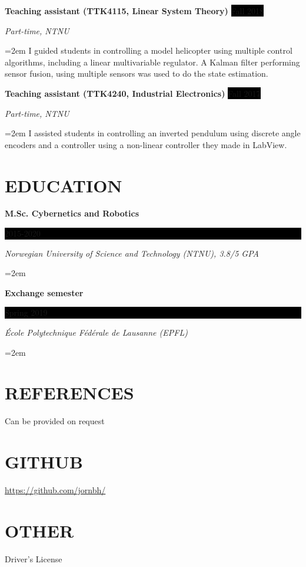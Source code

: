 \documentclass[paper=a4,fontsize=11pt,norsk]{scrartcl} %
\newlength{\spacebox}
\newcommand{\NewPart}[1]{\section*{\uppercase{#1}}}
\newcommand{\PersonalEntry}[2]{
		\noindent\hangindent=2em\hangafter=0 %
		\parbox{\spacebox}{        %
		\textit{#1}}		       %
		\hspace{1.5em} #2 \par}    %
\newcommand{\EducationEntry}[4]{
		\noindent \textbf{#1} \hfill      %
		\colorbox{Black}{%
			\parbox{6em}{%
			\hfill\color{White}#2}} \par  %
		\noindent \textit{#3} \par        %
		\noindent\hangindent=2em\hangafter=0 \small #4 %
		\normalsize \par}
\newcommand{\WorkEntry}[4]{				  %
		\noindent \textbf{#1} \hfill      %
		\colorbox{Black}{\color{White}#2} \par  %
		\noindent \textit{#3} \par              %
		\noindent\hangindent=2em\hangafter=0 \small #4 %
		\normalsize \par}
\begin{document}



\WorkEntry{Teaching assistant (TTK4115, Linear System Theory)}{Fall 2018}{Part-time, NTNU}
{I guided students in controlling a model helicopter using
multiple control algorithms, including a linear multivariable
regulator. A Kalman filter performing sensor fusion, using
multiple sensors was used to do the state estimation.
}

\WorkEntry{Teaching assistant (TTK4240, Industrial Electronics)}{Fall 2017}{Part-time, NTNU}
{I assisted students in controlling an inverted pendulum using discrete angle encoders and a controller using a non-linear controller they made in LabView.
}



\NewPart{Education}{}

\EducationEntry{M.Sc. Cybernetics and Robotics}{2015-2020}{Norwegian University of Science and Technology (NTNU), 3.8/5 GPA}{}
\EducationEntry{Exchange semester}{Spring 2019}{École Polytechnique Fédérale de Lausanne (EPFL)}{}

\NewPart{References}{}
Can be provided on request



\NewPart{GitHub}{}
\url{https://github.com/jornbh/}
\NewPart{Other}{}
Driver's License
\end{document}
